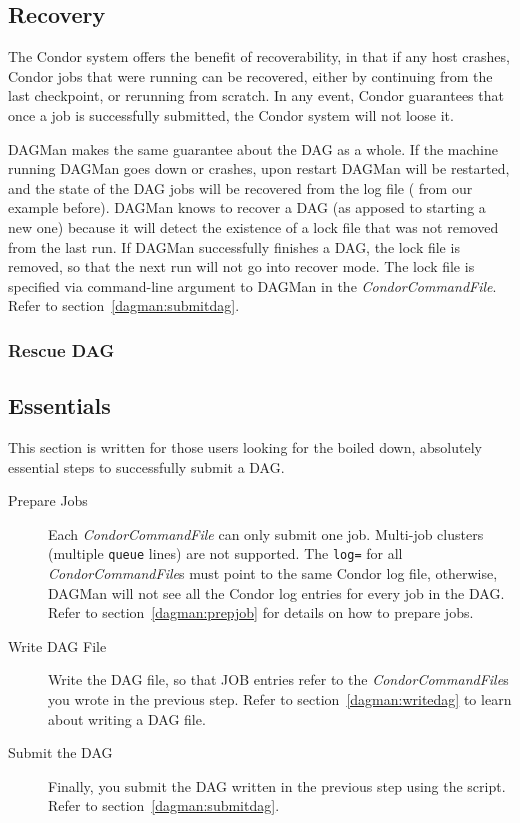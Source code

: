 \subsection{Recovery}

The Condor system offers the benefit of recoverability, in that if any host
crashes, Condor jobs that were running can be recovered, either by continuing
from the last checkpoint, or rerunning from scratch.  In any event, Condor
guarantees that once a job is successfully submitted, the Condor system will
not loose it.

DAGMan makes the same guarantee about the DAG as a whole.  If the machine
running DAGMan goes down or crashes, upon restart DAGMan will be restarted,
and the state of the DAG jobs will be recovered from the log file
( from our example before).  DAGMan knows to
recover a DAG (as apposed to starting a new one) because it will detect the
existence of a lock file that was not removed from the last run.  If DAGMan
successfully finishes a DAG, the lock file is removed, so that the next run
will not go into recover mode.  The lock file is specified via command-line
argument to DAGMan in the \textit{CondorCommandFile}.  Refer to
section~\ref{dagman:submitdag}.

\subsubsection{\label{dagman:rescue}Rescue DAG}

\Todo

\subsection{\label{dagman:essentials}Essentials}

This section is written for those users looking for the boiled down,
absolutely essential steps to successfully submit a DAG.

\begin{description}

\item[Prepare Jobs] 
Each \textit{CondorCommandFile} can only submit one job.
Multi-job clusters (multiple \texttt{queue} lines) are not supported.
The \texttt{log=} for all \textit{CondorCommandFile}s must point to
the same Condor log file, otherwise, DAGMan will not see all the
Condor log entries for every job in the DAG.  
Refer to section~\ref{dagman:prepjob} for details on how to prepare
jobs.

\item[Write DAG File] Write the DAG file, so that JOB entries refer to the
\textit{CondorCommandFile}s you wrote in the previous step.  Refer to
section~\ref{dagman:writedag} to learn about writing a DAG file.

\item[Submit the DAG] Finally, you submit the DAG written in the previous step
using the  script.  Refer to
section~\ref{dagman:submitdag}.

\end{description}


